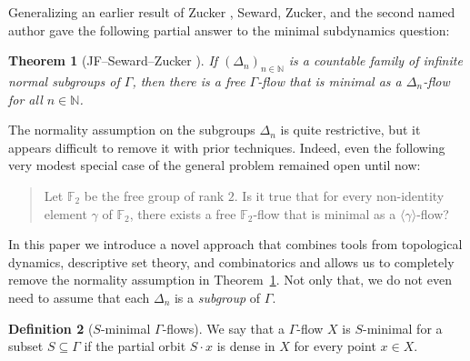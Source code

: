\documentclass[11pt,reqno,psamsfonts]{amsart}
\theoremstyle{bfnote}
\newtheorem{theo}{Theorem}[section]
\theoremstyle{definition}
\newtheorem{defn}[theo]{Definition}
\theoremstyle{remark}
\newcommand{\0}{\varnothing}
\newcommand{\set}[1]{\{#1\}}
\newcommand{\defeq}{\coloneqq}
\newcommand{\emphd}[1]{{\fontseries{b}\selectfont\textsf{#1}}}
\newcommand{\G}{\Gamma}
\newcommand{\N}{\mathbb{N}}
\numberwithin{equation}{section}
\begin{document}
    Generalizing an earlier result of Zucker \cite{Zucker}, Seward, Zucker, and the second named author gave the following partial answer to the minimal subdynamics question:

    \begin{theo}[{JF--Seward--Zucker \cite[Thm.~0.3]{FSZ}}]\label{theo:FSZ}
        If $(\Delta_n)_{n \in \N}$ is a countable family of infinite {normal} subgroups of $\G$, then
        there is a free $\G$-flow that is minimal as a $\Delta_n$-flow for all $n \in \N$.
    \end{theo}

    The normality assumption on the subgroups $\Delta_n$ is quite restrictive, but it appears difficult to remove it with prior techniques.
    Indeed, even the following very modest special case of the general problem remained open until now:

    \begin{quote}
        {Let $\mathbb{F}_2$ be the free group of rank $2$. Is it true that for every non-identity element $\gamma$ of $\mathbb{F}_2$, %
        there exists a free $\mathbb{F}_2$-flow that is minimal as a $\langle \gamma \rangle$-flow?}
    \end{quote}

    In this paper we introduce a novel approach that combines tools from topological dynamics, descriptive set theory, and combinatorics and allows us to completely remove the normality assumption in Theorem~\ref{theo:FSZ}. Not only that,  %
    we do not even need to assume that each $\Delta_n$ is a \emph{subgroup} of $\G$. %

    \begin{defn}[$S$-minimal $\G$-flows]\label{defn:S-minimal}
        We say that a $\G$-flow $X$ is \emphd{$S$-minimal} for a {subset} $S \subseteq \G$ if the partial orbit $S \cdot x$ is dense in $X$ for every point $x \in X$.
    \end{defn}

\end{document}
